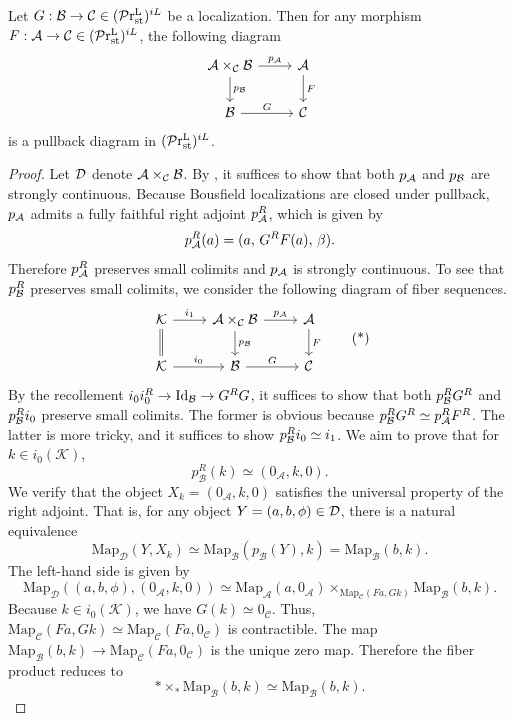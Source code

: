 \documentclass[a4paper,10pt, oneside]{amsart}
\begin{document}
	\begin{lem}\label{pullbackloc}
		Let $G:\mathcal{B}\to\mathcal{C}\in (\mathcal{P}\mathrm{r}_{\mathrm{st}}^\mathrm{L})^{iL}$ be a localization. Then for any morphism $F:\mathcal{A} \to\mathcal{C} \in (\mathcal{P}\mathrm{r}_{\mathrm{st}}^\mathrm{L})^{iL}$, the following diagram 
		$$
		\begin{tikzcd}
			\mca\times_{\mcc}\mcb \arrow[d, "p_{\mcb}"] \arrow[r, "p_{\mca}"] & \mca \arrow[d, "F"] \\
			\mcb \arrow[r, "G"]                                               & \mcc               
		\end{tikzcd}
		$$ 
		is a pullback diagram in $(\mathcal{P}\mathrm{r}_{\mathrm{st}}^\mathrm{L})^{iL}$.
	\end{lem}
	\begin{proof}
		Let $\mathcal{D}$ denote $\mathcal{A}\times_{\mathcal{C}}\mathcal{B}$. By \cite[Lemma 4.1]{ramzi2024dualizable}, it suffices to show that both $p_{\mathcal{A}}$ and $p_{\mathcal{B}}$ are strongly continuous. Because Bousfield localizations are closed under pullback, $p_{\mathcal{A}}$ admits a fully faithful right adjoint $p_{\mathcal{A}}^R$, which is given by
		$$p_{\mathcal{A}}^R(a) = (a,\, G^R F(a),\, \beta).$$ Therefore $p_{\mathcal{A}}^R$ preserves small colimits and $p_{\mathcal{A}}$ is strongly continuous. To see that $p_{\mathcal{B}}^R$ preserves small colimits, we consider the following diagram of fiber sequences.
	\begin{equation*}
		\begin{tikzcd}
			\mck \arrow[r, "i_1"] \arrow[d, Rightarrow, no head] & \mca\times_{\mcc}\mcb \arrow[d, "p_{\mcb}"] \arrow[r, "p_{\mca}"] & \mca \arrow[d, "F"] \\
			\mck \arrow[r, "i_0"]                                & \mcb \arrow[r, "G"]                                                & \mcc               
		\end{tikzcd}
		\tag{*}
	\end{equation*}
		By the recollement $i_0i_0^R\to \mathrm{Id}_{\mathcal{B}}\to G^RG$, it suffices to show that both $p_{\mathcal{B}}^RG^R$ and $p_{\mathcal{B}}^Ri_0$ preserve small colimits. The former is obvious because $p_{\mathcal{B}}^RG^R\simeq p_{\mathcal{A}}^RF^R$. The latter is more tricky, and it suffices to show $p_{\mathcal{B}}^Ri_0\simeq i_1$. We aim to prove that for $k \in i_0(\mathcal{K})$,
		$$p_{\mathcal{B}}^R(k) \simeq (0_{\mathcal{A}}, k, 0).$$
		We verify that the object $X_k = (0_{\mathcal{A}}, k, 0)$ satisfies the universal property of the right adjoint. That is, for any object $Y = (a, b, \phi) \in \mathcal{D}$, there is a natural equivalence
		$$\mathrm{Map}_{\mathcal{D}}(Y, X_k) \simeq \mathrm{Map}_{\mathcal{B}}(p_{\mathcal{B}}(Y), k) = \mathrm{Map}_{\mathcal{B}}(b, k).$$
		The left-hand side is given by
		$$\mathrm{Map}_{\mathcal{D}}((a, b, \phi), (0_{\mathcal{A}}, k, 0))
		\simeq \mathrm{Map}_{\mathcal{A}}(a, 0_{\mathcal{A}}) \times_{\mathrm{Map}_{\mathcal{C}}(F a, G k)} \mathrm{Map}_{\mathcal{B}}(b, k).$$
		Because $k \in i_0(\mathcal{K})$, we have $G(k) \simeq 0_{\mathcal{C}}$. Thus, $\mathrm{Map}_{\mathcal{C}}(F a, G k) \simeq \mathrm{Map}_{\mathcal{C}}(F a, 0_{\mathcal{C}})$ is  contractible. The map $\mathrm{Map}_{\mathcal{B}}(b, k) \to \mathrm{Map}_{\mathcal{C}}(F a, 0_{\mathcal{C}})$ is the unique zero map. Therefore the fiber product reduces to
		$$\ast \times_{\ast} \mathrm{Map}_{\mathcal{B}}(b, k) \simeq \mathrm{Map}_{\mathcal{B}}(b, k).$$
	\end{proof}
	
\end{document}
